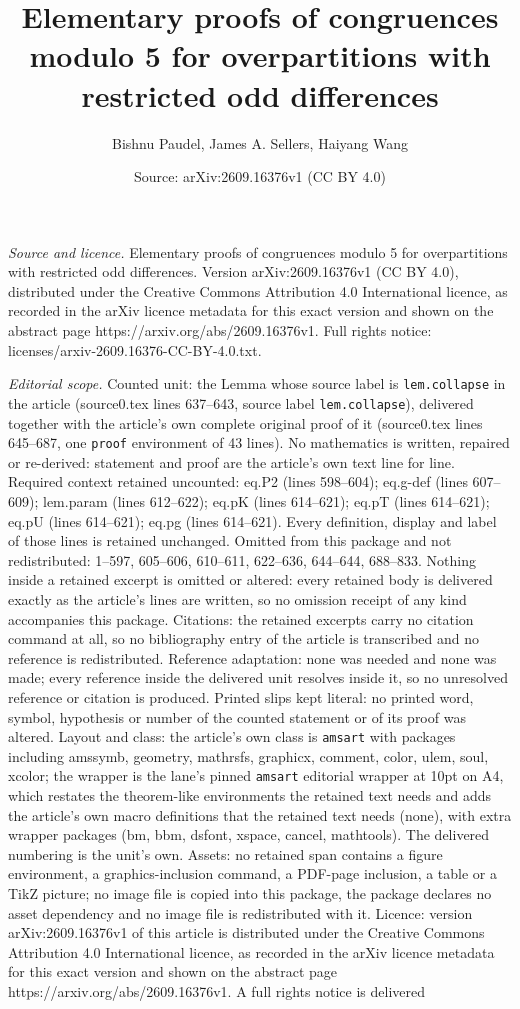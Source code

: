 \documentclass[10pt,a4paper]{amsart}
\title[Elementary proofs of congruences modulo 5 for overpartitions]{Elementary proofs of congruences modulo 5 for overpartitions with restricted odd differences}
\author{Bishnu Paudel, James A. Sellers, Haiyang Wang}
\date{Source: arXiv:2609.16376v1 (CC BY 4.0)}
\begin{document}
\maketitle

\noindent\emph{Source and licence.} Elementary proofs of congruences modulo 5 for overpartitions with restricted odd differences. Version arXiv:2609.16376v1 (CC BY 4.0), distributed under the Creative Commons Attribution 4.0 International licence, as recorded in the arXiv licence metadata for this exact version and shown on the abstract page https://arxiv.org/abs/2609.16376v1. Full rights notice: licenses/arxiv-2609.16376-CC-BY-4.0.txt.\par\smallskip

\noindent\textit{Editorial scope.} Counted unit: the Lemma whose source label is \texttt{lem.collapse} in the article (source0.tex lines 637--643, source label \texttt{lem.collapse}), delivered together with the article's own complete original proof of it (source0.tex lines 645--687, one \texttt{proof} environment of 43 lines). No mathematics is written, repaired or re-derived: statement and proof are the article's own text line for line. Required context retained uncounted: eq.P2 (lines 598--604); eq.g-def (lines 607--609); lem.param (lines 612--622); eq.pK (lines 614--621); eq.pT (lines 614--621); eq.pU (lines 614--621); eq.pg (lines 614--621). Every definition, display and label of those lines is retained unchanged. Omitted from this package and not redistributed: 1--597, 605--606, 610--611, 622--636, 644--644, 688--833. Nothing inside a retained excerpt is omitted or altered: every retained body is delivered exactly as the article's lines are written, so no omission receipt of any kind accompanies this package. Citations: the retained excerpts carry no citation command at all, so no bibliography entry of the article is transcribed and no reference is redistributed. Reference adaptation: none was needed and none was made; every reference inside the delivered unit resolves inside it, so no unresolved reference or citation is produced. Printed slips kept literal: no printed word, symbol, hypothesis or number of the counted statement or of its proof was altered. Layout and class: the article's own class is \texttt{amsart} with packages including amssymb, geometry, mathrsfs, graphicx, comment, color, ulem, soul, xcolor; the wrapper is the lane's pinned \texttt{amsart} editorial wrapper at 10pt on A4, which restates the theorem-like environments the retained text needs and adds the article's own macro definitions that the retained text needs (none), with extra wrapper packages (bm, bbm, dsfont, xspace, cancel, mathtools). The delivered numbering is the unit's own. Assets: no retained span contains a figure environment, a graphics-inclusion command, a PDF-page inclusion, a table or a TikZ picture; no image file is copied into this package, the package declares no asset dependency and no image file is redistributed with it. Licence: version arXiv:2609.16376v1 of this article is distributed under the Creative Commons Attribution 4.0 International licence, as recorded in the arXiv licence metadata for this exact version and shown on the abstract page https://arxiv.org/abs/2609.16376v1. A full rights notice is delivered 
\end{document}
